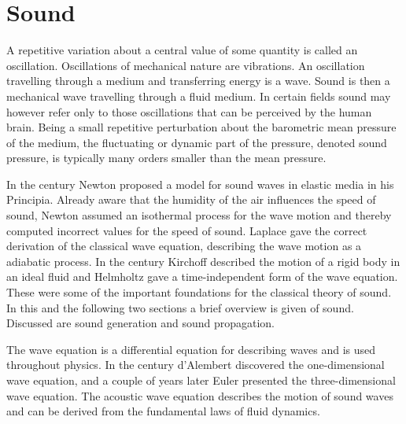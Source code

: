 \section{Sound}

A repetitive variation about a central value of some quantity is called an
oscillation. Oscillations of mechanical nature are vibrations. An
oscillation travelling through a medium and transferring energy is a wave. Sound
is then a mechanical wave travelling through a fluid medium.
In certain fields sound may however refer only to those oscillations that can be perceived by the human brain.
Being a small repetitive perturbation about the barometric
mean pressure of the medium, the fluctuating or dynamic part of the pressure,
denoted sound pressure, is typically many orders smaller than the mean
pressure.

In the  century Newton proposed a model for sound waves in elastic media
in his Principia. Already aware that the humidity of the air influences the
speed of sound, Newton assumed an isothermal process for the wave motion and
thereby computed incorrect values for the speed of sound. Laplace gave the
correct derivation of the classical wave equation, describing the wave motion as
a adiabatic process. In the  century Kirchoff described the motion of a
rigid body in an ideal fluid and Helmholtz gave a time-independent form of the
wave equation. These were some of the important foundations for the classical
theory of sound.
In this and the following two sections a brief overview is given of sound. Discussed are sound
generation and sound propagation.

The wave equation is a differential equation for describing waves and is used
throughout physics. In the  century d'Alembert discovered the
one-dimensional wave equation, and a couple of years later Euler presented the
three-dimensional wave equation. The acoustic wave equation describes the motion
of sound waves and can be derived from the fundamental laws of fluid dynamics.

